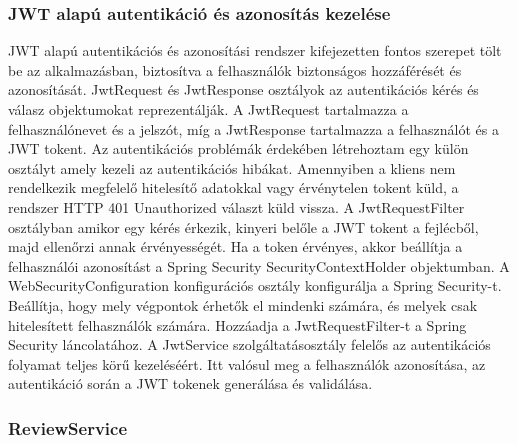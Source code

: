 \subsubsection{JWT alapú autentikáció és azonosítás kezelése}

JWT alapú autentikációs és azonosítási rendszer kifejezetten fontos szerepet tölt be az alkalmazásban, biztosítva a felhasználók biztonságos hozzáférését és azonosítását. JwtRequest és JwtResponse osztályok az autentikációs kérés és válasz objektumokat reprezentálják. A JwtRequest tartalmazza a felhasználónevet és a jelszót, míg a JwtResponse tartalmazza a felhasználót és a JWT tokent. Az autentikációs problémák érdekében létrehoztam egy külön osztályt amely kezeli az autentikációs hibákat. Amennyiben a kliens nem rendelkezik megfelelő hitelesítő adatokkal vagy érvénytelen tokent küld, a rendszer HTTP 401 Unauthorized választ küld vissza. A JwtRequestFilter osztályban amikor egy kérés érkezik, kinyeri belőle a JWT tokent a fejlécből, majd ellenőrzi annak érvényességét. Ha a token érvényes, akkor beállítja a felhasználói azonosítást a Spring Security SecurityContextHolder objektumban. A WebSecurityConfiguration konfigurációs osztály konfigurálja a Spring Security-t. Beállítja, hogy mely végpontok érhetők el mindenki számára, és melyek csak hitelesített felhasználók számára. Hozzáadja a JwtRequestFilter-t a Spring Security láncolatához. A JwtService szolgáltatásosztály felelős az autentikációs folyamat teljes körű kezeléséért. Itt valósul meg a felhasználók azonosítása, az autentikáció során a JWT tokenek generálása és validálása. 


\subsubsection{ReviewService}

